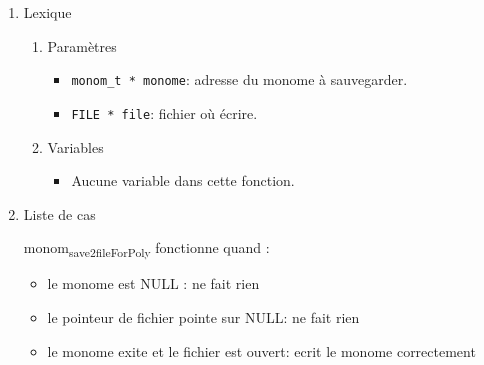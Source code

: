 \documentclass[11pt]{article}
\begin{document}
\begin{enumerate}
\item Lexique
\label{sec:orgd2e95a6}
\begin{enumerate}
\item Paramètres
\label{sec:orgd57cb8d}
\begin{itemize}
\item \texttt{monom\_t * monome}: adresse du monome à sauvegarder.
\item \texttt{FILE * file}: fichier où écrire.
\end{itemize}
\item Variables
\label{sec:orgdf457e5}
\begin{itemize}
\item Aucune variable dans cette fonction.
\end{itemize}
\end{enumerate}
\item Liste de cas
\label{sec:orgc5693ca}

monom\textsubscript{save2fileForPoly} fonctionne quand :
\begin{itemize}
\item le monome est NULL : ne fait rien
\item le pointeur de fichier pointe sur NULL: ne fait rien
\item le monome exite et le fichier est ouvert: ecrit le monome correctement
\end{itemize}
\end{enumerate}
\end{document}
